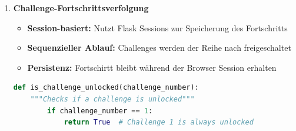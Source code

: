\documentclass{article}
\begin{document}
\begin{enumerate}
    \item \textbf{Challenge-Fortschrittsverfolgung}
    \begin{itemize}
        \item \textbf{Session-basiert:} Nutzt Flask Sessions zur Speicherung des Fortschritts
        \item \textbf{Sequenzieller Ablauf:} Challenges werden der Reihe nach freigeschaltet
        \item \textbf{Persistenz:} Fortschirtt bleibt während der Browser Session erhalten
    \end{itemize}
    \begin{lstlisting}[language=Python,caption={Challenge-Lock}]
    def is_challenge_unlocked(challenge_number):
    """Checks if a challenge is unlocked"""
        if challenge_number == 1:
            return True  # Challenge 1 is always unlocked
    

\end{lstlisting}
\end{enumerate}
\end{document}
